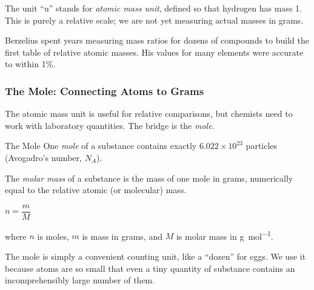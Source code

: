 \documentclass[12pt, a4paper]{book}
\theoremstyle{definition}
\newcommand{\newterm}[1]{\textit{\textcolor{DiscoveryColor}{#1}}}
\begin{document}
\vspace{0.5em}

The unit ``u'' stands for \newterm{atomic mass unit},
defined so that hydrogen has mass 1.
This is purely a relative scale; we are not yet
measuring actual masses in grams.

Berzelius spent years measuring mass ratios for dozens of compounds
to build the first table of relative atomic masses.
His values for many elements were accurate to within 1\%.

\subsubsection{The Mole: Connecting Atoms to Grams}

The atomic mass unit is useful for relative comparisons,
but chemists need to work with laboratory quantities.
The bridge is the \newterm{mole}.

\begin{namedconcept}{The Mole}
One \newterm{mole} of a substance contains
exactly $6.022 \times 10^{23}$ particles
(Avogadro's number, $N_A$).

The \newterm{molar mass} of a substance is the mass
of one mole in grams, numerically equal to the
relative atomic (or molecular) mass.

\begin{center}
$n = \dfrac{m}{M}$
\end{center}

where $n$ is moles, $m$ is mass in grams,
and $M$ is molar mass in \si{\gram\per\mol}.
\end{namedconcept}

\vspace{0.5em}

The mole is simply a convenient counting unit,
like a ``dozen'' for eggs.
We use it because atoms are so small that even a tiny quantity
of substance contains an incomprehensibly large number of them.
\end{document}
